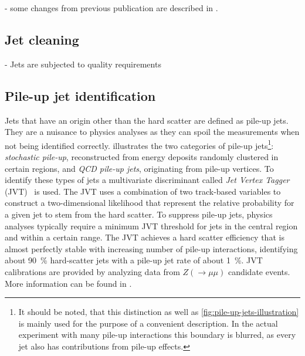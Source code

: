 - some changes from previous publication \cite{PERF-2015-09} are described in \cite{JETM-2018-05}.


\subsection{Jet cleaning}

- Jets are subjected to quality requirements



\subsection{Pile-up jet identification}
Jets that have an origin other than the hard scatter are defined as pile-up jets.
They are a nuisance to physics analyses as they can spoil the measurements when not being identified correctly.
 illustrates the two categories of pile-up jets\footnote{It should be noted, that this distinction as well as \cref{fig:pile-up-jets-illustration} is mainly used for the purpose of a convenient description. In the actual experiment with many pile-up interactions this boundary is blurred, as every jet also has contributions from pile-up effects.}:
\emph{stochastic pile-up}, reconstructed from energy deposits randomly clustered in certain regions, and \emph{QCD pile-up jets}, originating from pile-up vertices.
To identify these types of jets a multivariate discriminant called \emph{Jet Vertex Tagger} (JVT)~\cite{ATLAS-CONF-2014-018} is used.
The JVT uses a combination of two track-based variables to construct a two-dimensional likelihood that represent the relative probability for a given jet to stem from the hard scatter.
To suppress pile-up jets, physics analyses typically require a minimum JVT threshold for jets in the central region  and within a certain \pT range.
The JVT achieves a hard scatter efficiency that is almost perfectly stable with increasing number of pile-up interactions, identifying about \SI{90}{\percent} hard-scatter jets with a pile-up jet rate of about \SI{1}{\percent}.
JVT calibrations are provided by analyzing data from $Z (\rightarrow \mu\mu)$ candidate events.
More information can be found in .



